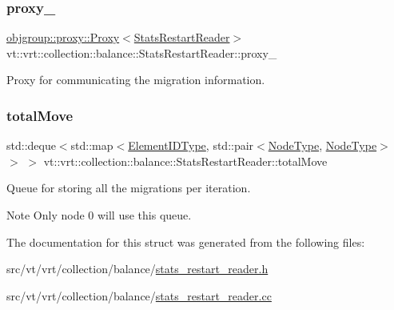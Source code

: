 \subsubsection{\texorpdfstring{proxy\+\_\+}{proxy\_}}
{\footnotesize\ttfamily \hyperlink{structvt_1_1objgroup_1_1proxy_1_1_proxy}{objgroup\+::proxy\+::\+Proxy}$<$\hyperlink{structvt_1_1vrt_1_1collection_1_1balance_1_1_stats_restart_reader}{Stats\+Restart\+Reader}$>$ vt\+::vrt\+::collection\+::balance\+::\+Stats\+Restart\+Reader\+::proxy\+\_\+\hspace{0.3cm}{\ttfamily [private]}}



Proxy for communicating the migration information. 

\mbox{\label{structvt_1_1vrt_1_1collection_1_1balance_1_1_stats_restart_reader_aabfc46df6681168e7f982c8b7ea5c778}} 
\subsubsection{\texorpdfstring{total\+Move}{totalMove}}
{\footnotesize\ttfamily std\+::deque$<$std\+::map$<$\hyperlink{namespacevt_1_1vrt_1_1collection_1_1balance_a592736f733df4f90856df90a1fd08905}{Element\+I\+D\+Type}, std\+::pair$<$\hyperlink{namespacevt_a866da9d0efc19c0a1ce79e9e492f47e2}{Node\+Type}, \hyperlink{namespacevt_a866da9d0efc19c0a1ce79e9e492f47e2}{Node\+Type}$>$ $>$ $>$ vt\+::vrt\+::collection\+::balance\+::\+Stats\+Restart\+Reader\+::total\+Move\hspace{0.3cm}{\ttfamily [private]}}



Queue for storing all the migrations per iteration. 

\begin{DoxyNote}{Note}
Only node 0 will use this queue. 
\end{DoxyNote}


The documentation for this struct was generated from the following files\+:\begin{DoxyCompactItemize}
\item 
src/vt/vrt/collection/balance/\hyperlink{stats__restart__reader_8h}{stats\+\_\+restart\+\_\+reader.\+h}\item 
src/vt/vrt/collection/balance/\hyperlink{stats__restart__reader_8cc}{stats\+\_\+restart\+\_\+reader.\+cc}\end{DoxyCompactItemize}
